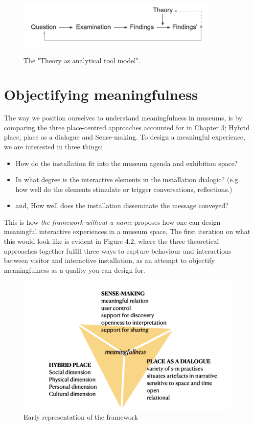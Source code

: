 \begin{figure}[H]
    \centering
    \includegraphics[width=10cm]{pictures/Theory/analytical_theory.png}
    \caption{The "Theory as analytical tool model".}
    \autocite[p. 133]{beck_examining_2016}
\end{figure}

\section{Objectifying meaningfulness}
The way we position ourselves to understand meaningfulness in museums, is by comparing the three place-centred approaches accounted for in Chapter 3; Hybrid place, place as a dialogue and Sense-making. To design a meaningful experience, we are interested in three things:

\begin{itemize}
    \item How do the installation fit into the museum agenda and exhibition space?
    \item In what degree is the interactive elements in the installation dialogic? (e.g. how well do the elements stimulate or trigger conversations, reflections.)
    \item and, How well does the installation disseminate the message conveyed?
\end{itemize}

This is how \emph{the framework without a name} proposes how one can design meaningful interactive experiences in a museum space. The first iteration on what this would look like is evident in Figure 4.2, where the three theoretical approaches together fulfill three ways to capture behaviour and interactions between visitor and interactive installation, as an attempt to objectify meaningfulness as a quality you can design for. 

\begin{figure}[H]
\centering
\includegraphics[width=12.5cm]{pictures/Theory/triangle_first.png}
\caption{Early representation of the framework}
\end{figure}

